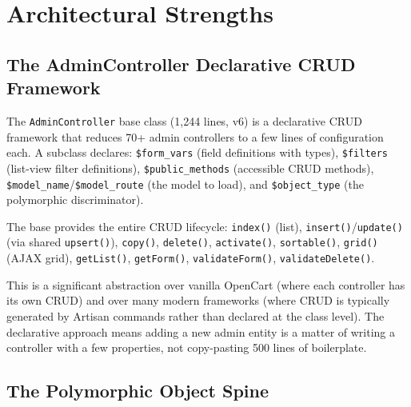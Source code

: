 \documentclass[11pt,a4paper]{article}
\begin{document}
\section{Architectural Strengths}\label{sec:good}

\subsection{The AdminController Declarative CRUD Framework}

\begin{goodbox}
The \texttt{AdminController} base class (1,244 lines, v6) is a declarative
CRUD framework that reduces 70+ admin controllers to a few lines of
configuration each. A subclass declares:
\texttt{\$form\_vars} (field definitions with types),
\texttt{\$filters} (list-view filter definitions),
\texttt{\$public\_methods} (accessible CRUD methods),
\texttt{\$model\_name}/\texttt{\$model\_route} (the model to load),
and \texttt{\$object\_type} (the polymorphic discriminator).

The base provides the entire CRUD lifecycle:
\texttt{index()} (list), \texttt{insert()}/\texttt{update()} (via
shared \texttt{upsert()}), \texttt{copy()}, \texttt{delete()},
\texttt{activate()}, \texttt{sortable()}, \texttt{grid()} (AJAX grid),
\texttt{getList()}, \texttt{getForm()}, \texttt{validateForm()},
\texttt{validateDelete()}.

This is a significant abstraction over vanilla OpenCart (where each
controller has its own CRUD) and over many modern frameworks (where
CRUD is typically generated by Artisan commands rather than declared
at the class level). The declarative approach means adding a new admin
entity is a matter of writing a controller with a few properties, not
copy-pasting 500 lines of boilerplate.
\end{goodbox}

\subsection{The Polymorphic Object Spine}
\end{document}
